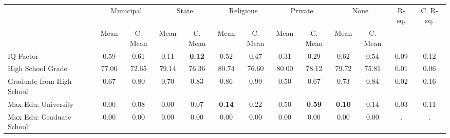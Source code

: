 \begin{tabular}{l c c c c c c c c c c c c}
\toprule
& \multicolumn{2}{c}{Municipal} & \multicolumn{2}{c}{State} & \multicolumn{2}{c}{Religious} & \multicolumn{2}{c}{Private} & \multicolumn{2}{c}{None} & R-sq. & C. R-sq. \\
& \scriptsize Mean & \scriptsize C. Mean & \scriptsize Mean & \scriptsize C. Mean & \scriptsize Mean & \scriptsize C. Mean & \scriptsize Mean & \scriptsize C. Mean & \scriptsize Mean & \scriptsize C. Mean & & \\
\midrule
IQ Factor &      0.59 & 0.61 &      0.11 & \textbf{     0.12} &      0.52 & 0.47 &      0.31 & 0.29 &      0.62 & 0.54 &      0.09 &      0.12 \\
High School Grade &     77.00 & 72.65 &     79.14 & 76.36 &     80.74 & 76.60 &     80.00 & 78.12 &     79.72 & 75.81 &      0.01 &      0.06 \\
Graduate from High School &      0.67 & 0.80 &      0.70 & 0.83 &      0.86 & 0.99 &      0.50 & 0.67 &      0.73 & 0.84 &      0.02 &      0.16 \\
Max Edu: University &      0.00 & 0.08 &      0.00 & 0.07 & \textbf{     0.14} & 0.22 &      0.50 & \textbf{     0.59} & \textbf{     0.10} & 0.14 &      0.03 &      0.11 \\
Max Edu: Graduate School &      0.00 & 0.00 &      0.00 & 0.00 &      0.00 & 0.00 &      0.00 & 0.00 &      0.00 & 0.00 &         . &         . \\
\bottomrule
\end{tabular}
